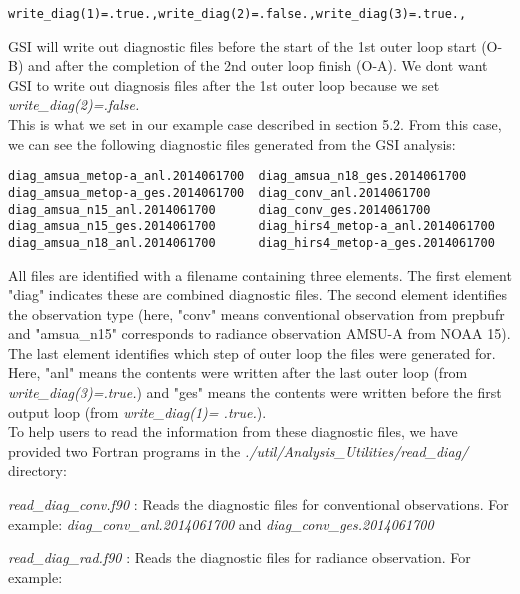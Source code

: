 \begin{scriptsize}
\begin{verbatim}
write_diag(1)=.true.,write_diag(2)=.false.,write_diag(3)=.true.,
\end{verbatim}
\end{scriptsize}

GSI will write out diagnostic files before the start of the 1st outer loop start (O-B) and after the completion of the 2nd outer loop finish (O-A). We don\textquotesingle t want GSI to write out diagnosis files after the 1st outer loop because we set \textit{write\_diag(2)=.false.} \\

This is what we set in our example case described in section 5.2. From this case, we can see the following diagnostic files generated from the GSI analysis:
\begin{scriptsize}
\begin{verbatim}
diag_amsua_metop-a_anl.2014061700  diag_amsua_n18_ges.2014061700
diag_amsua_metop-a_ges.2014061700  diag_conv_anl.2014061700
diag_amsua_n15_anl.2014061700      diag_conv_ges.2014061700
diag_amsua_n15_ges.2014061700      diag_hirs4_metop-a_anl.2014061700
diag_amsua_n18_anl.2014061700      diag_hirs4_metop-a_ges.2014061700
\end{verbatim}
\end{scriptsize}

All files are identified with a filename containing three elements.  The first element  "diag" indicates these are combined diagnostic files.  The second element identifies the observation type (here, "conv" means conventional observation from prepbufr and "amsua\_n15" corresponds to radiance observation AMSU-A from NOAA 15).  The last element identifies which step of outer loop the files were generated for.  Here, "anl" means the contents were written after the last outer loop (from \textit{write\_diag(3)=.true.}) and "ges" means the contents were written before the first output loop (from \textit{write\_diag(1)= .true.}). \\

To help users to read the information from these diagnostic files, we have provided two Fortran programs in the  \textit{./util/Analysis\_Utilities/read\_diag/} directory:

\begin{hangparas}{.4in}{1} 
\hspace{2ex} \textit{read\_diag\_conv.f90} : Reads the diagnostic files for conventional observations. For example: \textit{diag\_conv\_anl.2014061700} and \textit{diag\_conv\_ges.2014061700}

\hspace{2ex} \textit{read\_diag\_rad.f90} : Reads the diagnostic files for radiance observation. For example: 
 \end{hangparas}
 
